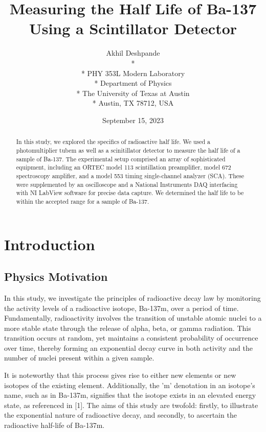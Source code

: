 \documentclass[10pt,letterpaper,onecolumn]{article}
\begin{document}
\title{\Large\bf Measuring the Half Life of Ba-137 Using a Scintillator Detector}
\author{
 Akhil Deshpande \\*
  \\*
 PHY 353L Modern Laboratory \\*
 Department of Physics \\*
 The University of Texas at Austin \\*
 Austin, TX 78712, USA
}
\date{September 15, 2023}



\maketitle
\begin{abstract}

  In this study, we explored the specifics of radioactive half life. We used a photomultiplier
  tubem as well as a scinitillator detector to measure the half life of a sample of Ba-137.
  The experimental setup comprised an array of sophisticated equipment, 
  including an ORTEC model 113 scintillation preamplifier, model 672 spectroscopy 
  amplifier, and a model 553 timing single-channel analyzer (SCA). 
  These were supplemented by an oscilloscope and a National 
  Instruments DAQ interfacing with NI LabView software for precise data capture.
  We determined the half life to be within the accepted range for a sample of Ba-137.

 

\end{abstract}
\section{Introduction}
\subsection{Physics Motivation}
In this study, we investigate the principles of radioactive decay 
law by monitoring the activity levels of a radioactive isotope, Ba-137m, 
over a period of time. Fundamentally, radioactivity involves the transition 
of unstable atomic nuclei to a more stable state through the release of alpha, 
beta, or gamma radiation. This transition occurs at random, yet maintains a consistent 
probability of occurrence over time, thereby forming an exponential decay curve in both
 activity and the number of nuclei present within a given sample.

It is noteworthy that this process gives rise to either new elements or new 
isotopes of the existing element. Additionally, the 'm' denotation in an isotope's 
name, such as in Ba-137m, signifies that the isotope exists in an elevated energy state, 
as referenced in [1]. 
The aims of this study are twofold: 
firstly, to illustrate the exponential nature of radioactive decay, 
and secondly, to ascertain the radioactive half-life of Ba-137m.
\end{document}
